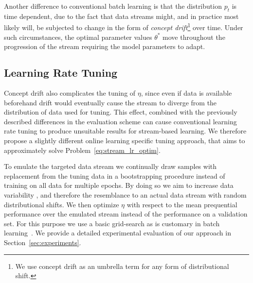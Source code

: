 \documentclass[letterpaper]{article} %
\begin{document}
Another difference to conventional batch learning is that the distribution $p_t$ is time dependent, due to the fact that data streams might, and in practice most likely will, be subjected to change in the form of \textit{concept drift}\footnote{We use concept drift as an umbrella term for any form of distributional shift.} over time.
Under such circumstances, the optimal parameter values $\theta^*$ move throughout the progression of the stream requiring the model parameters to adapt.



\subsection{Learning Rate Tuning}

Concept drift also complicates the tuning of $\eta$, since even if data is available beforehand drift would eventually cause the stream to diverge from the distribution of data used for tuning.
This effect, combined with the previously described differences in the evaluation scheme can cause conventional learning rate tuning to produce unsuitable results for stream-based learning.
We therefore propose a slightly different online learning specific tuning approach, that aims to approximately solve Problem~\ref{eq:stream_lr_optim}.

To emulate
the targeted data stream we continually draw samples with replacement from the tuning data in a bootstrapping procedure instead of training on all data for multiple epochs.
By doing so we aim to increase data variability%
, and therefore the resemblance to an actual data stream with random distributional shifts.
We then optimize $\eta$ with respect to the mean prequential performance over the emulated stream instead of the performance on a validation set.
For this purpose we use a basic grid-search as is customary in batch learning~\cite{defazioLearningRateFreeLearningDAdaptation2023a}.
We provide a detailed experimental evaluation of our approach in Section~\ref{sec:experiments}.
\end{document}
